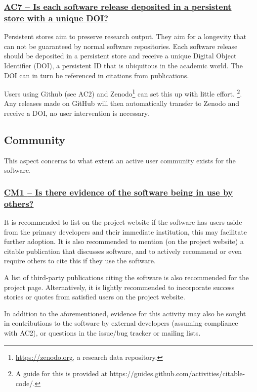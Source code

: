 \documentclass[a4paper,11pt]{article}
\newcommand{\indicator}[1]{\subsubsection*{\underline{#1}}}
\begin{document}
\newcommand{\acSevenName}{AC7}
\newcommand{\acSevenID}{\acSevenName}
\newcommand{\acSevenText}{Is each software release deposited in a persistent store with a unique DOI?}
\indicator{\acSevenName{ }--{ }\acSevenText}\label{id:ac7} 

Persistent stores aim to preserve research output. They aim for a longevity
that can not be guaranteed by normal software repositories. Each software
release should be deposited in a persistent store and receive a unique Digital
Object Identifier (DOI),  a persistent ID that is ubiquitous in the academic
world. The DOI can in turn be referenced in citations from publications.

Users using Github (see AC2) and Zenodo\footnote{\url{https://zenodo.org}, a
research data repository.} can set this up with little effort. \footnote{A guide
for this is provided at https://guides.github.com/activities/citable-code/.}.
Any releases made on GitHub will then automatically transfer to Zenodo and
receive a DOI, no user intervention is necessary. 

\subsection{Community}\label{sec:com}

This aspect concerns to what extent an active user community exists for the
software.

\newcommand{\cmOneName}{CM1}
\newcommand{\cmOneID}{\cmOneName}
\newcommand{\cmOneText}{Is there evidence of the software being in use by others?}
\indicator{\cmOneName{ }--{ }\cmOneText}\label{id:cm1} 

It is recommended to list on the project website if the software has 
users aside from the primary developers and their immediate institution, this
may facilitate further adoption. It is also recommended to mention (on the
project website) a citable publication that discusses software, and to actively
recommend or even require others to cite this if they use the software.

A list of third-party publications citing the software is also recommended for
the project page. Alternatively, it is lightly recommended to
incorporate success stories or quotes from satisfied users on the project
website.

In addition to the aforementioned, evidence for this activity may also be sought
in contributions to the software by external developers (assuming
compliance with AC2), or questions in the issue/bug tracker or mailing lists.
\end{document}
